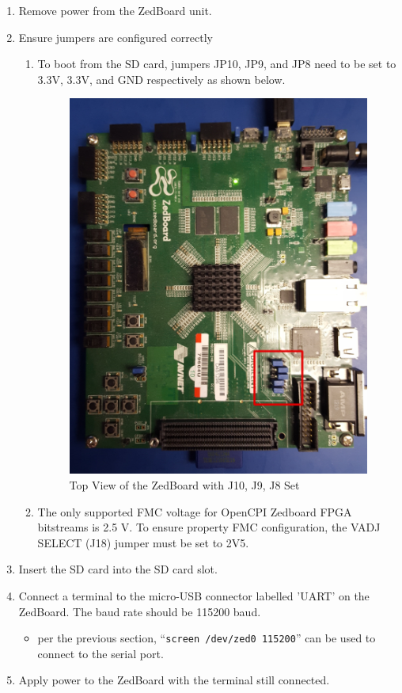 \begin{enumerate}
\item Remove power from the ZedBoard unit.
\item Ensure jumpers are configured correctly
\begin{enumerate}
\item To boot from the SD card, jumpers JP10, JP9, and JP8 need to be set to 3.3V, 3.3V, and GND respectively as shown below.
\begin{figure}[ht]
	\centerline{\includegraphics[scale=0.15]{zed_top}}
	\caption{Top View of the ZedBoard with J10, J9, J8 Set}
	\label{fig:zed_top}
\end{figure}
\item The only supported FMC voltage for OpenCPI Zedboard FPGA bitstreams is 2.5 V. To ensure property FMC configuration, the VADJ SELECT (J18) jumper must be set to 2V5.
\end{enumerate}
\item Insert the SD card into the SD card slot.
\item Connect a terminal to the micro-USB connector labelled 'UART' on the ZedBoard. The baud rate should be 115200 baud.
\begin{itemize}
\item per the previous section, ``\texttt{screen /dev/zed0 115200}'' can be used to connect to the serial port.
\end{itemize}
\item Apply power to the ZedBoard with the terminal still connected.
\end{enumerate}


